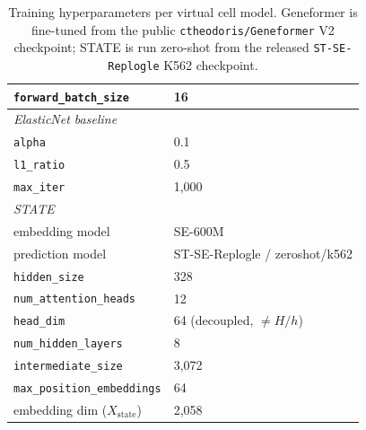 \documentclass{article}
\theoremstyle{plain}
\theoremstyle{definition}
\theoremstyle{remark}
\begin{document}
\begin{table}[h]
\begin{tabular}{ll}
\hspace{1em}\texttt{forward\_batch\_size}                  & 16 \\
\midrule
\multicolumn{2}{l}{\textit{ElasticNet baseline}~\citep{zou2005elasticnet}} \\
\hspace{1em}\texttt{alpha}                                 & 0.1 \\
\hspace{1em}\texttt{l1\_ratio}                             & 0.5 \\
\hspace{1em}\texttt{max\_iter}                             & 1{,}000 \\
\midrule
\multicolumn{2}{l}{\textit{STATE}~\citep{arc2025state}} \\
\hspace{1em}embedding model                                & SE-600M \\
\hspace{1em}prediction model                               & ST-SE-Replogle / zeroshot/k562 \\
\hspace{1em}\texttt{hidden\_size}                          & 328 \\
\hspace{1em}\texttt{num\_attention\_heads}                 & 12 \\
\hspace{1em}\texttt{head\_dim}                             & 64 (decoupled, $\neq H/h$) \\
\hspace{1em}\texttt{num\_hidden\_layers}                   & 8 \\
\hspace{1em}\texttt{intermediate\_size}                    & 3{,}072 \\
\hspace{1em}\texttt{max\_position\_embeddings}             & 64 \\
\hspace{1em}embedding dim ($X_{\mathrm{state}}$)           & 2{,}058 \\
\bottomrule
\end{tabular}
\caption{Training hyperparameters per virtual cell model. Geneformer is fine-tuned from the public \texttt{ctheodoris/Geneformer} V2 checkpoint; STATE is run zero-shot from the released \texttt{ST-SE-Replogle} K562 checkpoint.}
\label{tab:hparams}
\end{table}
\end{document}
